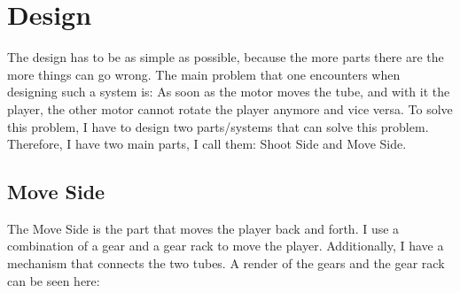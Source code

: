 \section{Design}\label{sec:design}
The design has to be as simple as possible, because the more parts there are the more things can go wrong.
The main problem that one encounters when designing such a system is:
As soon as the motor moves the tube, and with it the player, the other motor cannot rotate the player anymore and vice versa.
To solve this problem, I have to design two parts/systems that can solve this problem.
Therefore, I have two main parts, I call them: Shoot Side and Move Side.

\subsection{Move Side}\label{subsec:move-side}
The Move Side is the part that moves the player back and forth.
I use a combination of a gear and a gear rack to move the player.
Additionally, I have a mechanism that connects the two tubes.
A render of the gears and the gear rack can be seen here:\\

